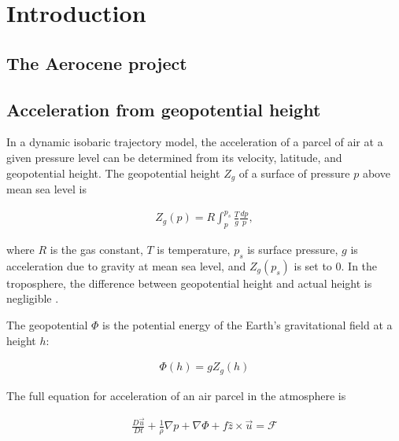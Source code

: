 \chapter{Introduction}

\section{The Aerocene project}

\section{Acceleration from geopotential height} \label{sec:acceleration}
In a dynamic isobaric trajectory model, the acceleration of a parcel of air at a given pressure level can be determined from its velocity, latitude, and geopotential height.
The geopotential height $Z_g$ of a surface of pressure $p$ above mean sea level is 

\begin{align}
    Z_g(p) = R \int_p^{p_s} \frac{T}{g} \frac{dp}{p},
\end{align}

where $R$ is the gas constant, $T$ is temperature, $p_s$ is surface pressure, $g$ is acceleration due to gravity at mean sea level, and $Z_g(p_s)$ is set to 0. 
In the troposphere, the difference between geopotential height and actual height is negligible \cite{marshall_atmosphere_2008}. 

The geopotential $\Phi$ is the potential energy of the Earth's gravitational field at a height $h$:

\begin{align}
    \Phi (h) = g Z_g (h) \label{eq:geopotential}
\end{align}

The full equation for acceleration of an air parcel in the atmosphere is

\begin{align}
    \frac{D \vec{u}}{Dt} + \frac{1}{\rho} \nabla p + \nabla \Phi + f \hat{z} \times \vec{u} = \mathcal{F} \label{eq:full}
\end{align}

